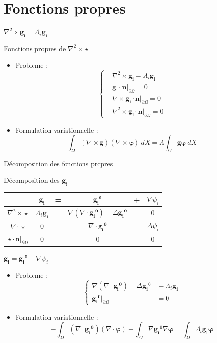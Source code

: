\documentclass{beamer}
\newcommand{\grad}{{\nabla}}
\newcommand{\laplace}{{\Delta}}
\newcommand{\rot}{{\nabla\times}}
\newcommand{\rott}{{\nabla^2\times}}
\renewcommand{\div}{{\nabla\cdot}}
\newcommand{\restr}{{\big\rvert_{\partial\Omega}}}
\begin{document}
\section{Fonctions propres}
\begin{frame}{$\rott  \mathbf{g_i} = \Lambda_i \mathbf{g_i}$}
\begin{block}{Fonctions propres de $\rott\star$}
\begin{itemize}
\item Problème :
\[
\left\{
\begin{aligned}
&\rott  \mathbf{g_i} = \Lambda_i \mathbf{g_i}\\
&\mathbf{g_i}\cdot \mathbf{n}\restr = 0\\
&\rot \mathbf{g_i}\cdot \mathbf{n}\restr = 0\\
&\rott  \mathbf{g_i}\cdot \mathbf{n}\restr = 0
\end{aligned}
\right.
\]
\item Formulation variationnelle :
\[
\int_\Omega (\rot \mathbf{g})(\rot\bm{\varphi})\ dX = \Lambda\int_\Omega \mathbf{g}\bm{\varphi}\ dX
\]
\end{itemize}
\end{block}
\end{frame}

\begin{frame}{Décomposition des fonctions propres}
\begin{block}{Décomposition des $\mathbf{g_i}$}
\begin{center}
\begin{tabular}{c|ccccc}
& $\mathbf{g_i}$ & = & $\mathbf{\mathbf{g_i}^0}$ & + & $\grad\psi_i$ \\ \hline
$\rott\star$ & $\Lambda_i \mathbf{g_i}$ & & $\grad(\div \mathbf{\mathbf{g_i}^0})-\laplace \mathbf{\mathbf{g_i}^0}$ & & 0\\ \hline
$\div\star$ & 0 & & $\div \mathbf{\mathbf{g_i}^0}$ & & $\laplace\psi_i$\\ \hline
$\star\cdot \mathbf{n}\restr$ & 0 & & 0 & & 0
\end{tabular}
\end{center}
\end{block}
\begin{block}{$\mathbf{g_i}=\mathbf{\mathbf{g_i}^0}+\grad\psi_i$}
\begin{itemize}
\item Problème :
\[
\left\{
\begin{aligned}
\grad(\div \mathbf{\mathbf{g_i}^0})-\laplace \mathbf{\mathbf{g_i}^0} &= \Lambda_i \mathbf{g_i}\\
\mathbf{\mathbf{g_i}^0}\restr &= 0
\end{aligned}
\right.
\]
\item Formulation variationnelle :
\[
-\int_\Omega (\div \mathbf{\mathbf{g_i}^0})(\div\bm{\varphi}) + \int_\Omega \grad \mathbf{\mathbf{g_i}^0}\grad\bm{\varphi} = \int_\Omega \Lambda_i\mathbf{g_i}\bm{\varphi}
\]
\end{itemize}
\end{block}
\end{frame}
\end{document}

